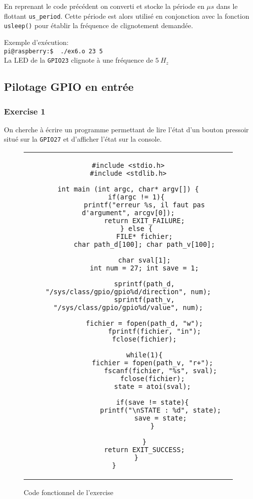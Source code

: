 \documentclass[11pt, openright]{book}
\begin{document}
En reprenant le code précédent on converti et stocke la période en $\mu s$ dans le flottant \texttt{us\_period}. Cette période est alors utilisé en conjonction avec la fonction \texttt{usleep()} pour établir la fréquence de clignotement demandée.

Exemple d'exécution:\\
\texttt{pi@raspberry:\text{$\sim$}\$ \ ./ex6.o 23 5}\\
La LED de la \texttt{GPIO23} clignote à une fréquence de $5\ H_z$

\subsection{Pilotage GPIO en entrée}

\subsubsection{Exercise 1}

On cherche à écrire un programme permettant de lire l'état d'un bouton pressoir situé sur la \texttt{GPIO27} et d'afficher l'état sur la console.

\begin{figure}[ht!]
	\centering
	\begin{tabular}{c}
		\begin{lstlisting}
#include <stdio.h>
#include <stdlib.h>

int main (int argc, char* argv[]) {
    if(argc != 1){
        printf("erreur %s, il faut pas d'argument", arcgv[0]);
        return EXIT_FAILURE;
    } else {
        FILE* fichier;
        char path_d[100]; char path_v[100];

        char sval[1];
        int num = 27; int save = 1;

        sprintf(path_d, "/sys/class/gpio/gpio%d/direction", num);
        sprintf(path_v, "/sys/class/gpio/gpio%d/value", num);

        fichier = fopen(path_d, "w");
             fprintf(fichier, "in");
        fclose(fichier);

        while(1){
            fichier = fopen(path_v, "r+");
                fscanf(fichier, "%s", sval);
            fclose(fichier);
            state = atoi(sval);

            if(save != state){
                printf("\nSTATE : %d", state);
                save = state;
            }
        
        }
        return EXIT_SUCCESS;
    }
}		
				\end{lstlisting}
	\end{tabular}
	\caption{Code fonctionnel de l'exercise }
\end{figure}
\end{document}
